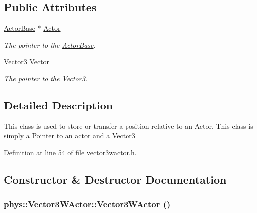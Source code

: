 \subsection*{Public Attributes}
\begin{DoxyCompactItemize}
\item 
\hypertarget{classphys_1_1Vector3WActor_ad9110e820da2e8eca9c3303cdc755938}{
\hyperlink{classphys_1_1ActorBase}{ActorBase} $\ast$ \hyperlink{classphys_1_1Vector3WActor_ad9110e820da2e8eca9c3303cdc755938}{Actor}}
\label{d2/de8/classphys_1_1Vector3WActor_ad9110e820da2e8eca9c3303cdc755938}

\begin{DoxyCompactList}\small\item\em The pointer to the \hyperlink{classphys_1_1ActorBase}{ActorBase}. \item\end{DoxyCompactList}\item 
\hypertarget{classphys_1_1Vector3WActor_ab8e056d80d61d3685af8db1da82a73ae}{
\hyperlink{classphys_1_1Vector3}{Vector3} \hyperlink{classphys_1_1Vector3WActor_ab8e056d80d61d3685af8db1da82a73ae}{Vector}}
\label{d2/de8/classphys_1_1Vector3WActor_ab8e056d80d61d3685af8db1da82a73ae}

\begin{DoxyCompactList}\small\item\em The pointer to the \hyperlink{classphys_1_1Vector3}{Vector3}. \item\end{DoxyCompactList}\end{DoxyCompactItemize}


\subsection{Detailed Description}
This class is used to store or transfer a position relative to an Actor. This class is simply a Pointer to an actor and a \hyperlink{classphys_1_1Vector3}{Vector3} 

Definition at line 54 of file vector3wactor.h.



\subsection{Constructor \& Destructor Documentation}
\hypertarget{classphys_1_1Vector3WActor_a910f3ee25e7f654e7ba3bedb9942c8f7}{
\subsubsection[{Vector3WActor}]{\setlength{\rightskip}{0pt plus 5cm}phys::Vector3WActor::Vector3WActor ()}}
\label{d2/de8/classphys_1_1Vector3WActor_a910f3ee25e7f654e7ba3bedb9942c8f7}


